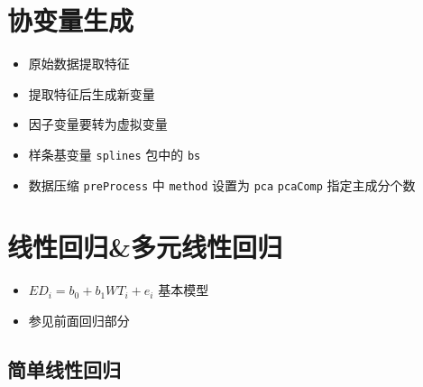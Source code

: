 \documentclass[
]{book}
\providecommand{\tightlist}{%
  \setlength{\itemsep}{0pt}\setlength{\parskip}{0pt}}
\begin{document}
\hypertarget{ux534fux53d8ux91cfux751fux6210}{%
\section{协变量生成}\label{ux534fux53d8ux91cfux751fux6210}}

\begin{itemize}
\tightlist
\item
  原始数据提取特征
\item
  提取特征后生成新变量
\item
  因子变量要转为虚拟变量
\item
  样条基变量 \texttt{splines} 包中的 \texttt{bs}
\item
  数据压缩 \texttt{preProcess} 中 \texttt{method} 设置为 \texttt{pca} \texttt{pcaComp} 指定主成分个数
\end{itemize}

\hypertarget{ux7ebfux6027ux56deux5f52ux591aux5143ux7ebfux6027ux56deux5f52}{%
\section{线性回归\&多元线性回归}\label{ux7ebfux6027ux56deux5f52ux591aux5143ux7ebfux6027ux56deux5f52}}

\begin{itemize}
\tightlist
\item
  \(ED_i = b_0 + b_1 WT_i + e_i\) 基本模型
\item
  参见前面回归部分
\end{itemize}

\hypertarget{ux7b80ux5355ux7ebfux6027ux56deux5f52}{%
\subsection{简单线性回归}\label{ux7b80ux5355ux7ebfux6027ux56deux5f52}}
\end{document}
